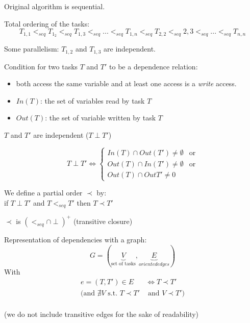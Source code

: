 \documentclass{article}
\begin{document}
\begin{algorithm}[H]
\end{algorithm}


Original algorithm is sequential.


Total ordering of the tasks:
\[T_{1,1} <_{seq} T_{1_2} <_{seq} T_{1,3} <_{seq} ... <_{seq} T_{1,n} <_{seq} T_{2,2} <_{seq} 2,3 <_{seq} ... <_{seq} T_{n,n}\]

Some parallelism: $T_{1,2}$ and $T_{1,3}$ are independent.

Condition for two tasks $T$ and $T'$ to be a dependence relation:
\begin{itemize}
\item both access the same variable and at least one access is a \emph{write} access.
\item $In(T)$: the set of variables read by task $T$
\item $Out(T)$: the set of variable written by task $T$
\end{itemize}

$T$ and $T'$ are independent ($T \perp T'$)

\[T \perp T' \Leftrightarrow
\begin{cases}
In(T)\cap Out(T')\neq \emptyset & \text{or}\\ 
Out(T)\cap In(T') \neq \emptyset &\text{or}\\
Out(T)\cap Out{T'} \neq 0
\end{cases}
\]

We define a partial order $\prec$ by:\\
if $T\perp T'$ and $T<_{seq} T'$ then $T\prec T'$

$\prec$ is $(<_{seq}\cap \perp)^+$ (transitive closure)

Representation of dependencies with a graph:
\[G=(\underbrace{V}_{\text{set of tasks}},\underbrace{E}_{oriented edges})\]
With
\begin{align*}
e=(T,T')\in E & \Leftrightarrow T \prec T'\\
\big(\text{and } \nexists V \text{ s.t. } T\prec T' & \text{ and } V \prec T' \big)\\
\end{align*}

(we do not include transitive edges for the sake of readability)
\end{document}

